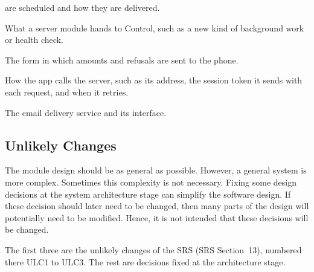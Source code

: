 \documentclass[12pt, titlepage]{article}
\newcounter{acnum}
\newcommand{\actheacnum}{AC\theacnum}
\begin{document}
\begin{description}
  are scheduled and how they are delivered.
\item[\refstepcounter{acnum} \actheacnum \label{acPlugins}:] What a server
  module hands to Control, such as a new kind of background work or health
  check.
\item[\refstepcounter{acnum} \actheacnum \label{acJSON}:] The form in which
  amounts and refusals are sent to the phone.
\item[\refstepcounter{acnum} \actheacnum \label{acAPI}:] How the app calls the
  server, such as its address, the session token it sends with each request,
  and when it retries.
\item[\refstepcounter{acnum} \actheacnum \label{acEmail}:] The email delivery
  service and its interface.
\end{description}



\subsection{Unlikely Changes} \label{SecUchange}

The module design should be as general as possible. However, a general system is
more complex. Sometimes this complexity is not necessary. Fixing some design
decisions at the system architecture stage can simplify the software design. If
these decision should later need to be changed, then many parts of the design
will potentially need to be modified. Hence, it is not intended that these
decisions will be changed.

The first three are the unlikely changes of the SRS (SRS Section~13), numbered
there ULC1 to ULC3. The rest are decisions fixed at the architecture stage.
\end{document}
